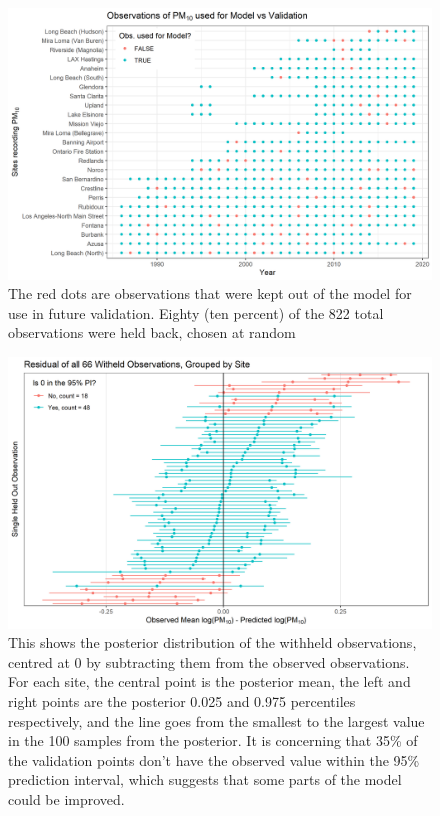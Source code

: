 \documentclass{article}
\begin{document}
\begin{figure}[ht]
	\centering
	\includegraphics[width = \textwidth]{Figures/Validation/validate_dotplot.png}
	\caption{The red dots are observations that were kept out of the model for use in future validation.  Eighty (ten percent) of the 822 total observations were held back, chosen at random}
	\label{fig:validate_dotplot}
\end{figure}

\begin{figure}[ht]
	\centering
	\includegraphics[width = \textwidth]{Figures/Validation/validate_delta_mean.png}
	\caption{This shows the posterior distribution of the withheld observations, centred at 0 by subtracting them from the observed observations.  For each site, the central point is the posterior mean, the left and right points are the posterior 0.025 and 0.975 percentiles respectively, and the line goes from the smallest to the largest value in the 100 samples from the posterior.  It is concerning that 35\% of the validation points don't have the observed value within the 95\% prediction interval, which suggests that some parts of the model could be improved.}
	\label{fig:validate_delta_mean}
\end{figure}
\end{document}
